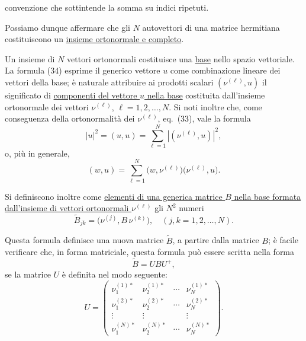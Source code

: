 \documentclass[11pt, a4paper]{book}
\numberwithin{equation}{section}
\begin{document}

convenzione che sottintende la somma su indici ripetuti.

Possiamo dunque affermare che gli $N$ autovettori di una matrice
hermitiana costituiscono un \uline{insieme ortonormale e completo}.

Un insieme di $N$ vettori ortonormali costituisce una \uline{base}
nello spazio vettoriale. La formula (34) esprime il generico vettore $u$
come combinazione lineare dei vettori della base; è naturale attribuire
ai prodotti scalari $(\nu^{(\ell)}, u)$ il significato di
\uline{componenti del vettore $u$ nella base} costituita dall'insieme
ortonormale dei vettori $\nu^{(\ell)}$, $\ell=1,2,\ldots,N$.
Si noti inoltre che, come conseguenza della ortonormalità dei $\nu^{(\ell)}$,
eq.\ (33), vale la formula
\begin{equation}
|u|^2 = (u, u) = \sum_{\ell=1}^{N} \left|(\nu^{(\ell)}, u)\right|^2,
\end{equation}
o, più in generale,
\begin{equation}
(w, u) = \sum_{\ell=1}^{N}
  \bigl(w, \nu^{(\ell)}\bigr)\bigl(\nu^{(\ell)}, u\bigr).
\end{equation}

Si definiscono inoltre come \uline{elementi di una generica matrice $B$
nella base formata dall'insieme di vettori ortonormali $\nu^{(\ell)}$} gli
$N^2$ numeri
\begin{equation}
\widetilde{B}_{jk} = \bigl(\nu^{(j)}, B\,\nu^{(k)}\bigr),
\quad (j,k = 1,2,\ldots,N).
\end{equation}

Questa formula definisce una nuova matrice $\widetilde{B}$, a partire dalla
matrice $B$; è facile verificare che, in forma matriciale, questa formula
può essere scritta nella forma
\begin{equation}
\widetilde{B} = UBU^+,
\end{equation}
se la matrice $U$ è definita nel modo seguente:
\begin{equation}
U =
\begin{pmatrix}
\nu_1^{(1)*} & \nu_2^{(1)*} & \cdots & \nu_N^{(1)*} \\
\nu_1^{(2)*} & \nu_2^{(2)*} & \cdots & \nu_N^{(2)*} \\
\vdots       & \vdots       &        & \vdots       \\
\nu_1^{(N)*} & \nu_2^{(N)*} & \cdots & \nu_N^{(N)*}
\end{pmatrix}.
\tag{40a}
\end{equation}
\end{document}
